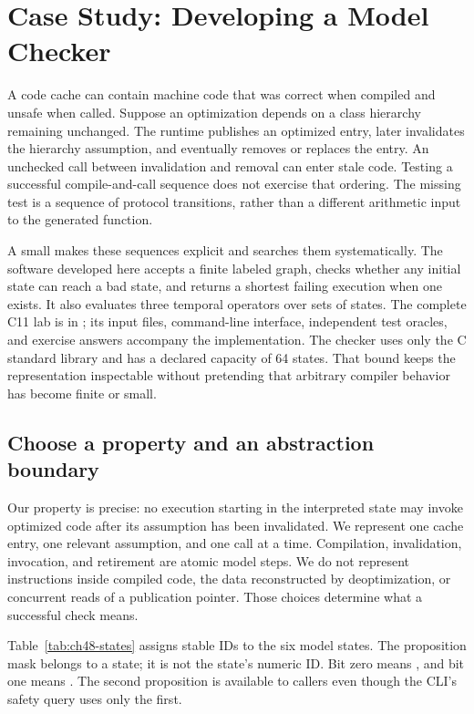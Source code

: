 \chapter{Case Study: Developing a Model Checker}
\label{ch:model-checker-case-study}

A code cache can contain machine code that was correct when compiled and unsafe when called.
Suppose an optimization depends on a class hierarchy remaining unchanged.
The runtime publishes an optimized entry, later invalidates the hierarchy assumption, and eventually removes or replaces the entry.
An unchecked call between invalidation and removal can enter stale code.
Testing a successful compile-and-call sequence does not exercise that ordering.
The missing test is a sequence of protocol transitions, rather than a different arithmetic input to the generated function.

A small  makes these sequences explicit and searches them systematically.
The software developed here accepts a finite labeled graph, checks whether any initial state can reach a bad state, and returns a shortest failing execution when one exists.
It also evaluates three temporal operators over sets of states.
The complete C11 lab is in ; its input files, command-line interface, independent test oracles, and exercise answers accompany the implementation.
The checker uses only the C standard library and has a declared capacity of 64 states.
That bound keeps the representation inspectable without pretending that arbitrary compiler behavior has become finite or small.

\section{Choose a property and an abstraction boundary}
\label{sec:ch48-model}

Our property is precise: no execution starting in the interpreted state may invoke optimized code after its assumption has been invalidated.
We represent one cache entry, one relevant assumption, and one call at a time.
Compilation, invalidation, invocation, and retirement are atomic model steps.
We do not represent instructions inside compiled code, the data reconstructed by deoptimization, or concurrent reads of a publication pointer.
Those choices determine what a successful check means.

Table~\ref{tab:ch48-states} assigns stable IDs to the six model states.
The proposition mask belongs to a state; it is not the state's numeric ID.
Bit zero means , and bit one means .
The second proposition is available to callers even though the CLI's safety query uses only the first.

